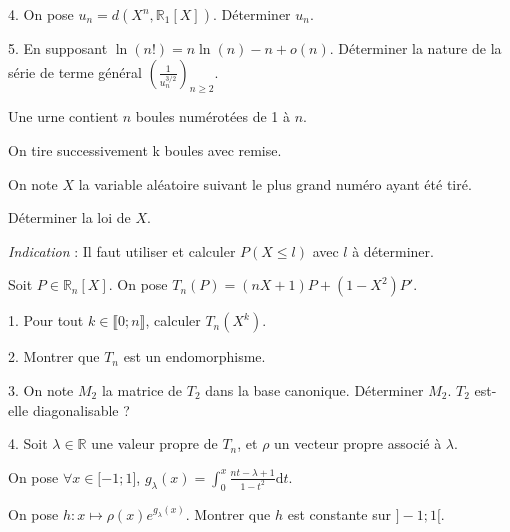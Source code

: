 \vspace{10pt}
4. On pose $u_n = d(X^n, \mathbb{R}_1[X])$. Déterminer $u_n$.

\vspace{10pt}
5. En supposant $\ln(n!) = n\ln(n) - n + o(n)$. Déterminer la nature de la série de terme général
$\displaystyle \left(\frac {1} {u_n^{3/2}}\right)_{n \geqslant 2}$.




\subetoiles




\noindent Une urne contient $n$ boules numérotées de 1 à $n$.

\noindent On tire successivement k boules avec remise.

\noindent On note $X$ la variable aléatoire suivant le plus grand numéro ayant été tiré.

\vspace{10pt}
Déterminer la loi de $X$.

\vspace{10pt}
\noindent \textit{Indication} : Il faut utiliser et calculer $P(X \leqslant l)$ avec $l$ à déterminer.




\subetoiles
\columnbreak




\noindent Soit $P \in \mathbb{R}_n[X]$. On pose $T_n(P) = (nX+1)P + (1-X^2)P'$.

\vspace{5pt}
1. Pour tout $k \in \llbracket 0;n \rrbracket$, calculer $T_n(X^k)$.

\vspace{5pt}
2. Montrer que $T_n$ est un endomorphisme.

\vspace{5pt}
3. On note $M_2$ la matrice de $T_2$ dans la base canonique. Déterminer $M_2$. $T_2$ est-elle diagonalisable ?

\vspace{5pt}
4. Soit $\lambda \in \mathbb{R}$ une valeur propre de $T_n$, et $\rho$ un vecteur propre associé à $\lambda$.

\vspace{5pt}
On pose $\forall x \in \lbrack -1; 1 \rbrack$,
$\displaystyle g_{\lambda}(x) = \int_{0}^{x} \frac {n t - \lambda + 1} {1 - t^2} \mathrm{d}t$.

\vspace{5pt}
On pose $h : x \mapsto \rho(x)e^{g_{\lambda}(x)}$. Montrer que $h$ est constante sur $\rbrack -1;1 \lbrack$.

